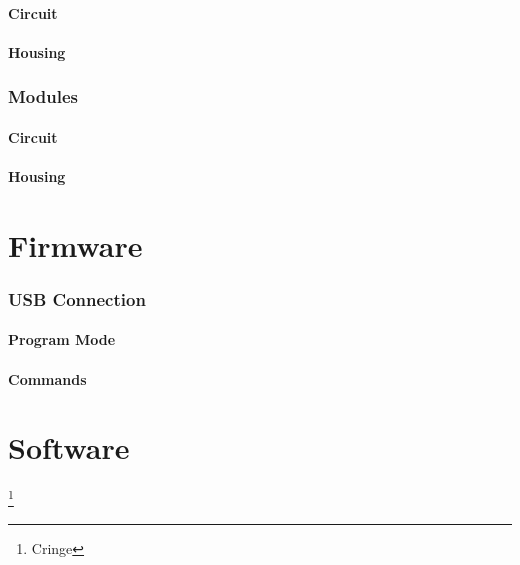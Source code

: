 \paragraph{Circuit}
\paragraph{Housing}

\subsubsection{Modules}
\paragraph{Circuit}
\paragraph{Housing}


\section{Firmware}
\label{Firmware}

\subsubsection{USB Connection}
\label{USB Connection}
\paragraph{Program Mode}
\paragraph{Commands}


\section{Software}
\label{Software}

\footnote{Cringe}




